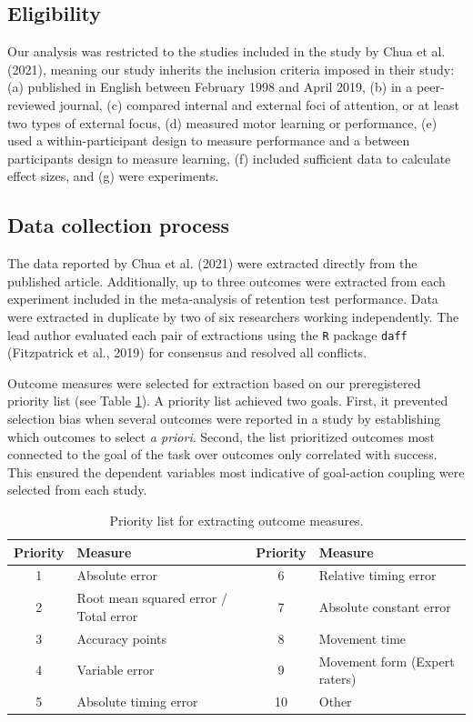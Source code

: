 \documentclass[
  11pt,
  doc, donotrepeattitle,floatsintext]{apa7}
\begin{document}
\hypertarget{eligibility}{%
\subsection{Eligibility}\label{eligibility}}

Our analysis was restricted to the studies included in the study by Chua et al. (2021), meaning our study inherits the inclusion criteria imposed in their study: (a) published in English between February 1998 and April 2019, (b) in a peer-reviewed journal, (c) compared internal and external foci of attention, or at least two types of external focus, (d) measured motor learning or performance, (e) used a within-participant design to measure performance and a between participants design to measure learning, (f) included sufficient data to calculate effect sizes, and (g) were experiments.

\hypertarget{data-collection-process}{%
\subsection{Data collection process}\label{data-collection-process}}

The data reported by Chua et al. (2021) were extracted directly from the published article. Additionally, up to three outcomes were extracted from each experiment included in the meta-analysis of retention test performance. Data were extracted in duplicate by two of six researchers working independently. The lead author evaluated each pair of extractions using the \texttt{R} package \texttt{daff} (Fitzpatrick et al., 2019) for consensus and resolved all conflicts.

Outcome measures were selected for extraction based on our preregistered priority list (see Table \ref{tab:table1}). A priority list achieved two goals. First, it prevented selection bias when several outcomes were reported in a study by establishing which outcomes to select \emph{a priori}. Second, the list prioritized outcomes most connected to the goal of the task over outcomes only correlated with success. This ensured the dependent variables most indicative of goal-action coupling were selected from each study.

\begin{table}

\caption{\label{tab:table1}Priority list for extracting outcome measures.}
\fontsize{10}{12}\selectfont
\begin{tabular}[t]{clcl}
\toprule
Priority & Measure & Priority & Measure\\
\midrule
1 & Absolute error & 6 & Relative timing error\\
2 & Root mean squared error / Total error & 7 & Absolute constant error\\
3 & Accuracy points & 8 & Movement time\\
4 & Variable error & 9 & Movement form (Expert raters)\\
5 & Absolute timing error & 10 & Other\\
\bottomrule
\end{tabular}
\end{table}
\end{document}
